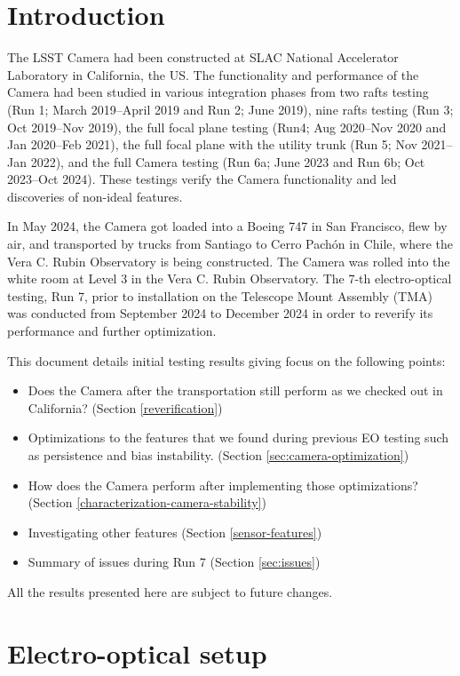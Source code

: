 \section{Introduction}
The LSST Camera had been constructed at SLAC National Accelerator Laboratory in California, the US.
The functionality and performance of the Camera had been studied in various integration phases from two rafts testing (Run 1; March 2019--April 2019 and Run 2; June 2019), nine rafts testing (Run 3; Oct 2019--Nov 2019), the full focal plane testing (Run4; Aug 2020--Nov 2020 and Jan 2020--Feb 2021), the full focal plane with the utility trunk (Run 5; Nov 2021--Jan 2022), and the full Camera testing (Run 6a; June 2023 and Run 6b; Oct 2023--Oct 2024). These testings verify the Camera functionality and led discoveries of non-ideal features.

In May 2024, the Camera got loaded into a Boeing 747 in San Francisco, flew by air, and transported by trucks from Santiago to Cerro Pachón in Chile, where the Vera C. Rubin Observatory is being constructed. The Camera was rolled into the white room at Level 3 in the Vera C. Rubin Observatory. The 7-th electro-optical testing, Run 7, prior to installation on the Telescope Mount Assembly (TMA) was conducted from September 2024 to December 2024 in order to reverify its performance and further optimization.

This document details initial testing results giving focus on the following points:
\begin{itemize}
    \item Does the Camera after the transportation still perform as we checked out in California? (Section \ref{reverification})
    \item Optimizations to the features that we found during previous EO testing such as persistence and bias instability. (Section \ref{sec:camera-optimization})
    \item How does the Camera perform after implementing those optimizations? (Section \ref{characterization-camera-stability})
    \item Investigating other features (Section \ref{sensor-features})
    \item Summary of issues during Run 7 (Section \ref{sec:issues})
\end{itemize}
All the results presented here are subject to future changes.

\section{Electro-optical setup}\label{electro-optical-setup}

